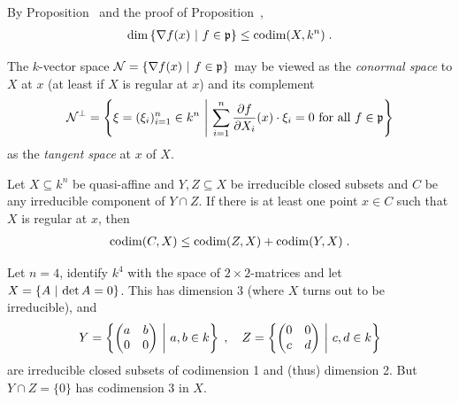 \documentclass[a4paper,parskip=half,numbers=enddot, DIV=12]{scrreprt}
\begin{document}
		
\begin{rem*}
    By Proposition~ and the proof of Proposition~, 
    \begin{align*}
        \dim\left\{\nabla f(x)\ \middle|\  f\in\mathfrak{p}\right\} \leq \operatorname{codim}(X,k^n)\;.
    \end{align*}
\end{rem*}
\begin{rem}
    The $k$-vector space $\mathcal{N} = \left\{\nabla f(x) \ \middle|\  f\in \mathfrak{p}\right\}$ may be viewed as the \emph{conormal space} to $X$ at $x$ (at least if $X$ is regular at $x$) and its complement 
    \begin{align*}
        \mathcal{N}^\perp = \left\{ \xi = (\xi_i)_{i=1}^n \in k^n \ \middle|\  \sum_{i=1}^{n}\frac{\partial f}{\partial X_i}(x)\cdot\xi_i=0 \text{ for all } f\in \mathfrak{p}\right\}
    \end{align*}
    as the \emph{tangent space} at $x$ of $X$.
\end{rem}
\begin{thm}
    Let $X\subseteq k^n$ be quasi-affine and $Y,Z \subseteq X$ be irreducible closed subsets and $C$ be any irreducible component of $Y\cap Z$. If there is at least one point $x\in C$ such that $X$ is regular at $x$, then 
    \begin{align*}
    	\operatorname{codim}(C,X) \leq \operatorname{codim} (Z,X)+\operatorname{codim}(Y,X)\;.
    \end{align*}
\end{thm}
\begin{rem}
    Let $n=4$, identify $k^4$ with the space of $2\times 2$-matrices and let $X= \left\{ A\ \middle|\  \operatorname{det} A = 0\right\}$. This has dimension 3 (where $X$ turns out to be irreducible), and 
    \begin{align*}
        Y = \left\{\begin{pmatrix} a&b\\ 0&0\end{pmatrix} \ \middle|\  a,b\in k \right\}\;,\quad
        Z = \left\{\begin{pmatrix} 0&0\\ c&d\end{pmatrix} \ \middle|\  c,d\in k \right\}
    \end{align*}  
    are irreducible closed subsets of codimension 1 and (thus) dimension 2. But $Y\cap Z = \{0\}$ has codimension 3 in $X$.
\end{rem}
\end{document}
